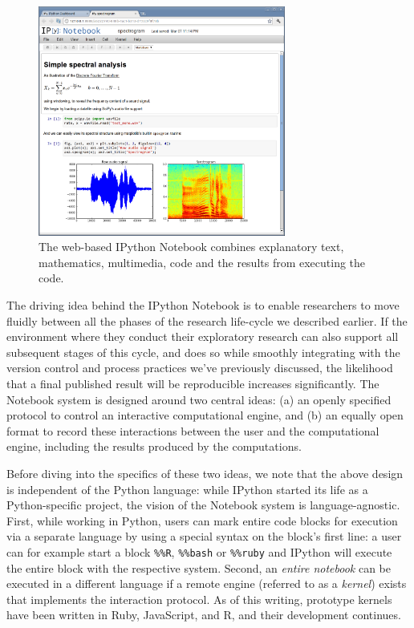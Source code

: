 \documentclass[ChapterTOCs,krantz2]{krantz} %
\theoremstyle{definition}
\begin{document}
\begin{figure}
  \begin{centering}
    \includegraphics[width=3.2in]{fig/ipython-notebook-specgram.png}\par
  \end{centering}

  \caption{\label{fig:IPython-notebook}The web-based IPython Notebook combines
    explanatory text, mathematics, multimedia, code and the results from
    executing the code.}
\end{figure}

The driving idea behind the IPython Notebook is to enable researchers to move
fluidly between all the phases of the research life-cycle we described earlier.
If the environment where they conduct their exploratory research can also
support all subsequent stages of this cycle, and does so while smoothly
integrating with the version control and process practices we've previously
discussed, the likelihood that a final published result will be reproducible
increases significantly.  The Notebook system is designed around two central
ideas: (a) an openly specified protocol to control an interactive computational
engine, and (b) an equally open format to record these interactions between the
user and the computational engine, including the results produced by the
computations.

Before diving into the specifics of these two ideas, we note that the above
design is independent of the Python language: while IPython started its life as
a Python-specific project, the vision of the Notebook system is
language-agnostic.  First, while working in Python, users can mark entire code
blocks for execution via a separate language by using a special syntax on the
block's first line: a user can for example start a block \texttt{\%\%R},
\texttt{\%\%bash} or \texttt{\%\%ruby} and IPython will execute the entire
block with the respective system.  Second, an \emph{entire notebook} can be
executed in a different language if a remote engine (referred to as a
\emph{kernel}) exists that implements the interaction protocol.  As of this
writing, prototype kernels have been written in Ruby, JavaScript, and R, and
their development continues.
\end{document}

